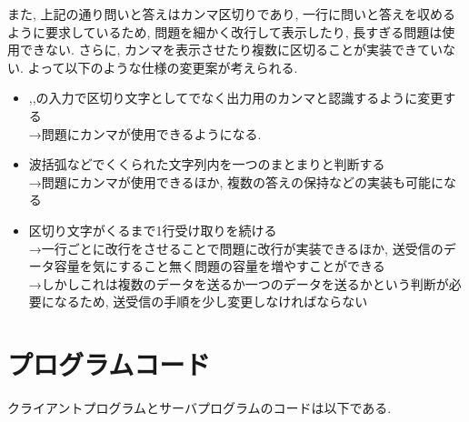 \documentclass[a4j]{jarticle}
\begin{document}
また, 上記の通り問いと答えはカンマ区切りであり, 一行に問いと答えを収めるように要求しているため, 問題を細かく改行して表示したり, 長すぎる問題は使用できない. 
さらに, カンマを表示させたり複数に区切ることが実装できていない.
よって以下のような仕様の変更案が考えられる.
\begin{itemize}
\item ,,の入力で区切り文字としてでなく出力用のカンマと認識するように変更する\\
  →問題にカンマが使用できるようになる.
\item 波括弧などでくくられた文字列内を一つのまとまりと判断する\\
  →問題にカンマが使用できるほか, 複数の答えの保持などの実装も可能になる
\item 区切り文字がくるまで1行受け取りを続ける\\
  →一行ごとに改行をさせることで問題に改行が実装できるほか, 送受信のデータ容量を気にすること無く問題の容量を増やすことができる\\
  →しかしこれは複数のデータを送るか一つのデータを送るかという判断が必要になるため, 送受信の手順を少し変更しなければならない
\end{itemize}

\section{プログラムコード}
クライアントプログラムとサーバプログラムのコードは以下である.
\end{document}
